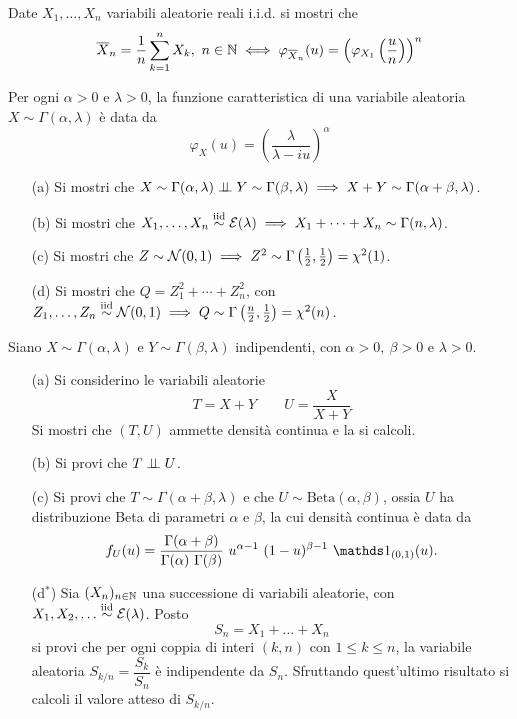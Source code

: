 \Esercizio{} %
Date $X_1,\dots,X_n$ variabili aleatorie reali i.i.d. si mostri che
\[
\overline{X}_n=\displaystyle\frac{1}{n}\sum_{k=1}^n X_k,\ n\in\mathbb{N}\iff \varphi_{\overline{X}_n}(u)=\left(\varphi_{X_1}\left(\frac{u}{n}\right)\right)^n
\]

\Esercizio{} %
Per ogni $\alpha>0$ e $\lambda>0$, la funzione caratteristica di una variabile aleatoria $X\sim\Gamma(\alpha,\lambda)$ è data da
\[
\varphi_X(u)=\left(\frac{\lambda}{\lambda-iu} \right)^\alpha
\]
\begin{enumerate}
\item [(a)] Si mostri che $X\sim\Gamma(\alpha,\lambda)\perp \!\!\! \perp Y\sim\Gamma(\beta,\lambda)\implies X+Y\sim\Gamma(\alpha+\beta,\lambda)$.
\item [(b)] Si mostri che $X_1,\dots,X_n\stackrel{\mathrm{iid}}{\sim}\mathcal{E}(\lambda)\implies X_1+\cdots+X_n\sim\Gamma(n,\lambda)$.
\item [(c)] Si mostri che $Z\sim\mathcal{N}(0,1)\implies Z^2\sim\Gamma\left(\frac{1}{2},\frac{1}{2}\right)=\chi^2(1)$.
\item [(d)] Si mostri che $Q=Z_1^2+\cdots+Z_n^2$, con $Z_1,\dots,Z_n\stackrel{\mathrm{iid}}{\sim}\mathcal{N}(0,1)\implies Q\sim\Gamma\left(\frac{n}{2},\frac{1}{2}\right)=\chi^2(n)$.
\end{enumerate}

\Esercizio{} %
Siano $X\sim\Gamma(\alpha,\lambda)$ e $Y\sim\Gamma(\beta,\lambda)$ indipendenti, con $\alpha>0,\ \beta>0$ e $\lambda>0$.
\begin{enumerate}
\item [(a)] Si considerino le variabili aleatorie
\[
T=X+Y\qquad U=\frac{X}{X+Y}
\]
Si mostri che $(T,U)$ ammette densità continua e la si calcoli.
\item [(b)] Si provi che $T\perp \!\!\! \perp U$.
\item [(c)] Si provi che $T\sim\Gamma(\alpha+\beta,\lambda)$ e che $U\sim\text{Beta}(\alpha,\beta)$, ossia $U$ ha distribuzione Beta di parametri $\alpha$ e $\beta$, la cui densità continua è data da
\[
f_U(u)=\frac{\Gamma(\alpha+\beta)}{\Gamma(\alpha)\ \Gamma(\beta)}\ u^{\alpha-1}\ (1-u)^{\beta-1}\ \Ind_{(0,1)}(u).
\]
\item [(d$^\ast$)] Sia $(X_n)_{n\in\mathbb{N}}$ una successione di variabili aleatorie, con $X_1,X_2,\dots\stackrel{\mathrm{iid}}{\sim}\mathcal{E}(\lambda)$. Posto
\[
S_n=X_1+\dots+X_n
\]
si provi che per ogni coppia di interi $(k,n)$ con $1\leq k\leq n$, la variabile aleatoria $S_{k/n}=\dfrac{S_k}{S_n}$ è indipendente da $S_n$. Sfruttando quest'ultimo risultato si calcoli il valore atteso di $S_{k/n}$.
\end{enumerate}


